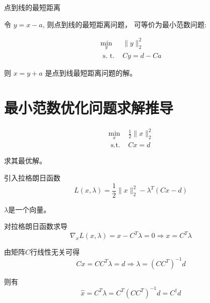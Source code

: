 \begin{FigureCenter}{点到线的最短距离}
    
\end{FigureCenter}


令 $ y=x-a $, 则点到线的最短距离问题， 可等价为最小范数问题:

\begin{problem}
    \begin{equation}
\begin{array}{ll}
\min _{y} & \|y\|_{2}^{2} \\
\text { s. t. } & C y=d-C a
\end{array}
\end{equation}
\end{problem}

则 $ x=y+a $ 是点到线最短距离问题的解。

\section{最小范数优化问题求解推导}

\begin{problem}
    \begin{equation}
\begin{array}{ll}
\min _{x}& \frac{1}{2}\|x\|_{2}^{2} \\
\text { s.t. }& C x=d
\end{array}
\end{equation}

求其最优解。
\end{problem}

引入拉格朗日函数
\begin{equation}
L(x, \lambda)=\frac{1}{2}\|x\|_{2}^{2}-\lambda^{T}(C x-d)
\end{equation}

\begin{remark}
    $\lambda$是一个向量。
\end{remark}

对拉格朗日函数求导
\begin{equation}
\nabla_{x} L(x, \lambda)=x-C^{T} \lambda=0 \Rightarrow x=C^{T} \lambda
\end{equation}

由矩阵$C$行线性无关可得
\begin{equation}
C x=C C^{T} \lambda=d \Rightarrow \lambda=\left(C C^{T}\right)^{-1} d
\end{equation}

则有
\begin{equation}
\hat{x}=C^{T} \lambda=C^{T}\left(C C^{T}\right)^{-1} d=C^{\dagger} d
\end{equation}

